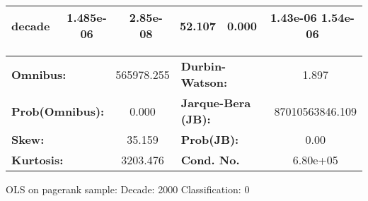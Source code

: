 \begin{center}
\begin{tabular}{lccccc}
\textbf{decade}             &    1.485e-06  &     2.85e-08     &    52.107  &         0.000        &      1.43e-06  1.54e-06       \\
\bottomrule
\end{tabular}
\begin{tabular}{lclc}
\textbf{Omnibus:}       & 565978.255 & \textbf{  Durbin-Watson:     } &        1.897     \\
\textbf{Prob(Omnibus):} &    0.000   & \textbf{  Jarque-Bera (JB):  } & 87010563846.109  \\
\textbf{Skew:}          &   35.159   & \textbf{  Prob(JB):          } &         0.00     \\
\textbf{Kurtosis:}      &  3203.476  & \textbf{  Cond. No.          } &     6.80e+05     \\
\bottomrule
\end{tabular}
\end{center}
\break
OLS on pagerank sample: Decade: 2000 Classification: 0
